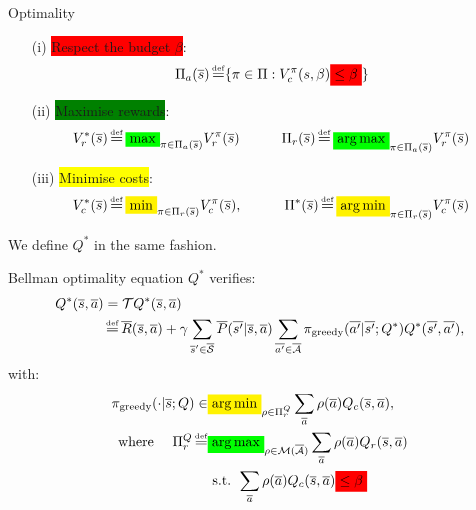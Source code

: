 \documentclass{beamer}
\newcommand{\mathcolorbox}[2]{\colorbox{#1}{$\displaystyle #2$}}
\begin{document}
    \begin{frame}{Optimality}
        \begin{definition}
            \begin{enumerate}
                \item[(i)] \pause\colorbox{red}{Respect the budget $\beta$}:
                \begin{equation*}
                    \Pi_a(\os) \eqdef \{\pi\in\Pi: V_c^\pi(s, \beta) \mathcolorbox{red}{\leq \beta}\}
                \end{equation*}
                \item[(ii)] \pause\colorbox{green}{Maximise rewards}:
                \begin{equation*}
                    V_r^*(\os) \eqdef \mathcolorbox{green}{\max}_{\pi\in\Pi_a(\os)}  V_r^\pi(\os) \qquad\quad \Pi_r(\os) \eqdef \mathcolorbox{green}{\argmax}_{\pi\in\Pi_a(\os)}  V_r^\pi(\os)
                \end{equation*}
                \item[(iii)] \pause\colorbox{yellow}{Minimise costs}:
                \begin{equation*}
                    V_c^*(\os) \eqdef \mathcolorbox{yellow}{\min}_{\pi\in\Pi_r(\os)}  V_c^\pi(\os), \qquad\quad \Pi^*(\os) \eqdef \mathcolorbox{yellow}{\argmin}_{\pi\in\Pi_r(\os)}  V_c^\pi(\os)
                \end{equation*}
            \end{enumerate}

            \pause We define $Q^*$ in the same fashion.
        \end{definition}
    \end{frame}

    \begin{frame}{}
        \begin{block}{Bellman optimality equation}
            $Q^*$ verifies:
            \begin{align*}
                Q^{*}(\os, \oa) &= \cT Q^{*}(\os, \oa)\\
                &\eqdef \ov{R}(\os, \oa) + \gamma \sum_{\os'\in\ocS} \ov{P}(\ov{s'} | \os, \oa)\sum_{\ov{a'}\in \ocA} \pi_\text{greedy}(\ov{a'}|\ov{s'}; Q^*) Q^{*}(\ov{s'}, \ov{a'}),
            \end{align*}
            with:\pause
            \begin{align*}
                \pi_\text{greedy}(\cdot|\os; Q) \in &\mathcolorbox{yellow}{\argmin}_{\rho\in\Pi_r^Q} \sum_{\oa}\rho(\oa) Q_c(\os, \oa), \\
                \text{where }\quad \Pi_r^Q \eqdef &\mathcolorbox{green}{\argmax}_{\rho\in\cM(\ocA)} \sum_{\oa}\rho(\oa) Q_r(\os, \oa) \\
                & \text{ s.t. }   \sum_{\oa}\rho(\oa) Q_c(\os, \oa) \mathcolorbox{red}{\leq \beta}
            \end{align*}
        \end{block}
    \end{frame}
\end{document}
